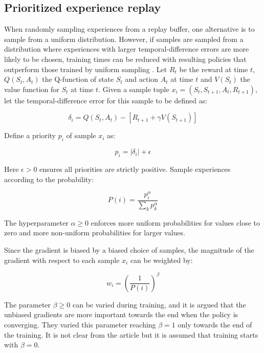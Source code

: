 \subsection{Prioritized experience replay}
\label{sec:prio_sampling}

When randomly sampling experiences from a replay buffer, one alternative is to
sample from a uniform distribution. However, if samples are sampled from a
distribution where experiences with larger temporal-difference errors are more
likely to be chosen, training times can be reduced with resulting policies that
outperform those trained by uniform sampling \cite{schaul2015prioritized}. Let
$R_{t}$ be the reward at time $t$, $Q(S_t, A_t)$ the Q-function of state $S_t$
and action $A_t$ at time $t$ and $V(S_t)$ the value function for $S_t$ at time
$t$. Given a sample tuple $x_i = (S_t, S_{t+1}, A_t, R_{t+1})$, let the
temporal-difference error for this sample to be defined as:

\begin{equation}
    \delta_i = Q(S_{t}, A_t) - \left[ R_{t+1} + \gamma V(S_{t+1}) \right]
\end{equation}

Define a priority $p_i$ of sample $x_i$ as:

\begin{equation}
    p_i = |\delta_i| + \epsilon
\end{equation}

Here $\epsilon > 0$ ensures all priorities are strictly positive. Sample experiences
according to the probability:

\begin{equation}
    P(i) = \frac{p_i^\alpha}{\sum_k p_k^\alpha}
\end{equation}

The hyperparameter $\alpha \geq 0$ enforces more uniform probabilities for values close to
zero and more non-uniform probabilities for larger values.

Since the gradient is biased by a biased choice of samples, the magnitude of
the gradient with respect to each sample $x_i$ can be weighted by:

\begin{equation}
    w_i = \left( \frac{1}{P(i)} \right)^\beta
\end{equation}

The parameter $\beta \geq 0$ can be varied during training, and it is argued that
the unbiased gradients are more important towards the end when the policy is
converging. They varied this parameter reaching $\beta = 1$ only towards the
end of the training. It is not clear from the article but it is assumed that
training starts with $\beta = 0$.

